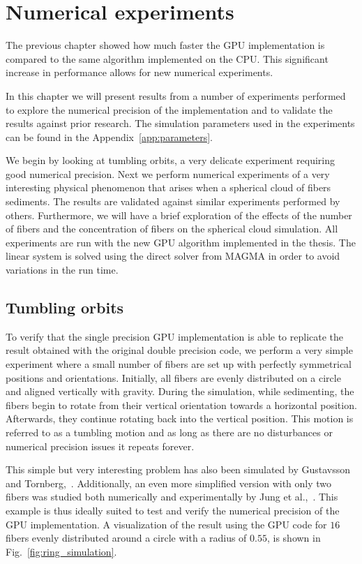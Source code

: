 \chapter{Numerical experiments}
\label{cha:experiments}

The previous chapter showed how much faster the GPU implementation is compared to the same algorithm implemented on the CPU. This significant increase in performance allows for new numerical experiments.

In this chapter we will present results from a number of experiments performed to explore the numerical precision of the implementation and to validate the results against prior research. The simulation parameters used in the experiments can be found in the Appendix~\ref{app:parameters}.

We begin by looking at tumbling orbits, a very delicate experiment requiring good numerical precision. Next we perform numerical experiments of a very interesting physical phenomenon that arises when a spherical cloud of fibers sediments. The results are validated against similar experiments performed by others. Furthermore, we will have a brief exploration of the effects of the number of fibers and the concentration of fibers on the spherical cloud simulation. All experiments are run with the new GPU algorithm  implemented in the thesis. The linear system is solved using the direct solver from MAGMA in order to avoid variations in the run time.

\section{Tumbling orbits}
\label{sec:example_ring}

To verify that the single precision GPU implementation is able to replicate the result obtained with the original double precision code, we perform a very simple experiment where a small number of fibers are set up with perfectly symmetrical positions and orientations. Initially, all fibers are evenly distributed on a circle and aligned vertically with gravity. During the simulation, while sedimenting, the fibers begin to rotate from their vertical orientation towards a horizontal position. Afterwards, they continue rotating back into the vertical position. This motion is referred to as a tumbling motion and as long as there are no disturbances or numerical precision issues it repeats forever.

This simple but very interesting problem has also been simulated by Gustavsson and Tornberg,~\cite{Gustavsson2009}. Additionally, an even more simplified version with only two fibers was studied both numerically and experimentally by Jung et al.,~\cite{Jung2006}. This example is thus ideally suited to test and verify the numerical precision of the GPU implementation. A visualization of the result using the GPU code for $16$ fibers evenly distributed around a circle with a radius of $0.55$, is shown in Fig.~\ref{fig:ring_simulation}.

